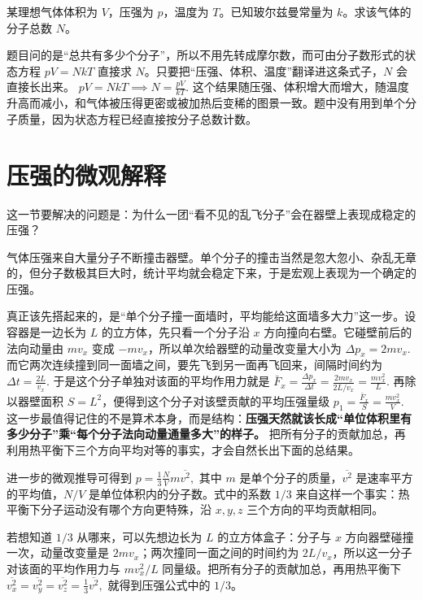 \documentclass[lang=cn,11pt]{elegantbook}
\begin{document}
\begin{exercise}[已知 \(p,V,T\) 时怎样先数出分子总数]
某理想气体体积为 \(V\)，压强为 \(p\)，温度为 \(T\)。已知玻尔兹曼常量为 \(k\)。求该气体的分子总数 \(N\)。
\end{exercise}

\begin{solution}
题目问的是“总共有多少个分子”，所以不用先转成摩尔数，而可由分子数形式的状态方程 \(pV=NkT\) 直接求 \(N\)。只要把“压强、体积、温度”翻译进这条式子，\(N\) 会直接长出来。
 \(pV=NkT\implies N=\frac{pV}{kT}.\) 
这个结果随压强、体积增大而增大，随温度升高而减小，和气体被压得更密或被加热后变稀的图景一致。题中没有用到单个分子质量，因为状态方程已经直接按分子总数计数。
\end{solution}

\section{压强的微观解释}

这一节要解决的问题是：为什么一团“看不见的乱飞分子”会在器壁上表现成稳定的压强？

气体压强来自大量分子不断撞击器壁。单个分子的撞击当然是忽大忽小、杂乱无章的，但分子数极其巨大时，统计平均就会稳定下来，于是宏观上表现为一个确定的压强。

真正该先搭起来的，是“单个分子撞一面墙时，平均能给这面墙多大力”这一步。设容器是一边长为 \(L\) 的立方体，先只看一个分子沿 \(x\) 方向撞向右壁。它碰壁前后的法向动量由 \(mv_x\) 变成 \(-mv_x\)，所以单次给器壁的动量改变量大小为
 \(\Delta p_x=2mv_x.\) 
而它两次连续撞到同一面墙之间，要先飞到另一面再飞回来，间隔时间约为
 \(\Delta t=\frac{2L}{v_x}.\) 
于是这个分子单独对该面的平均作用力就是
 \(\bar F_x=\frac{\Delta p_x}{\Delta t} =\frac{2mv_x}{2L/v_x} =\frac{mv_x^2}{L}.\) 
再除以器壁面积 \(S=L^2\)，便得到这个分子对该壁贡献的平均压强量级
 \(p_1=\frac{\bar F_x}{S}=\frac{mv_x^2}{V}.\) 
这一步最值得记住的不是算术本身，而是结构：\textbf{压强天然就该长成“单位体积里有多少分子”乘“每个分子法向动量通量多大”的样子。} 把所有分子的贡献加总，再利用热平衡下三个方向平均对等的事实，才会自然长出下面的总结果。

进一步的微观推导可得到
 \(p=\frac{1}{3}\frac{N}{V}m\overline{v^2},\) 
其中 \(m\) 是单个分子的质量，\(\overline{v^2}\) 是速率平方的平均值，\(N/V\) 是单位体积内的分子数。式中的系数 \(1/3\) 来自这样一个事实：热平衡下分子运动没有哪个方向更特殊，沿 \(x,y,z\) 三个方向的平均贡献相同。

\begin{note}
若想知道 \(1/3\) 从哪来，可以先想边长为 \(L\) 的立方体盒子：分子与 \(x\) 方向器壁碰撞一次，动量改变量是 \(2mv_x\)；两次撞同一面之间的时间约为 \(2L/v_x\)，所以这一分子对该面的平均作用力与 \(mv_x^2/L\) 同量级。把所有分子的贡献加总，再用热平衡下
 \(\overline{v_x^2}=\overline{v_y^2}=\overline{v_z^2}=\frac{1}{3}\overline{v^2},\) 
就得到压强公式中的 \(1/3\)。
\end{note}
\end{document}
